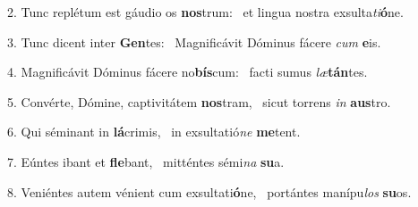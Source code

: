 2. Tunc replétum est gáudio os \textbf{nos}trum: \ast\  et lingua nostra exsulta\textit{ti}\textbf{ó}ne.\

3. Tunc dicent inter \textbf{Gen}tes: \ast\  Magnificávit Dóminus fácere \textit{cum} \textbf{e}is.\

4. Magnificávit Dóminus fácere no\textbf{bís}cum: \ast\  facti sumus \textit{læ}\textbf{tán}tes.\

5. Convérte, Dómine, captivitátem \textbf{nos}tram, \ast\  sicut torrens \textit{in} \textbf{aus}tro.\

6. Qui séminant in \textbf{lá}crimis, \ast\  in exsultatió\textit{ne} \textbf{me}tent.\

7. Eúntes ibant et \textbf{fle}bant, \ast\  mitténtes sémi\textit{na} \textbf{su}a.\

8. Veniéntes autem vénient cum exsultati\textbf{ó}ne, \ast\  portántes manípu\textit{los} \textbf{su}os.\

